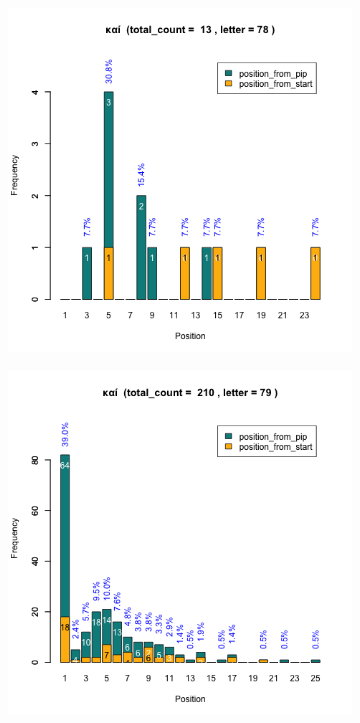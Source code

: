 \documentclass[a4paper]{article}
\begin{document}
\begin{figure}
\begin{subfigure}{0.45\textwidth}
\centering
\includegraphics[width=1\linewidth]{../../data/output/paul_R_par/plots/par3_lt78.png}
\end{subfigure}
\begin{subfigure}{0.45\textwidth}
\centering
\includegraphics[width=1\linewidth]{../../data/output/paul_R_par/plots/par3_lt79.png}
\end{subfigure}
\end{figure}
\end{document}
